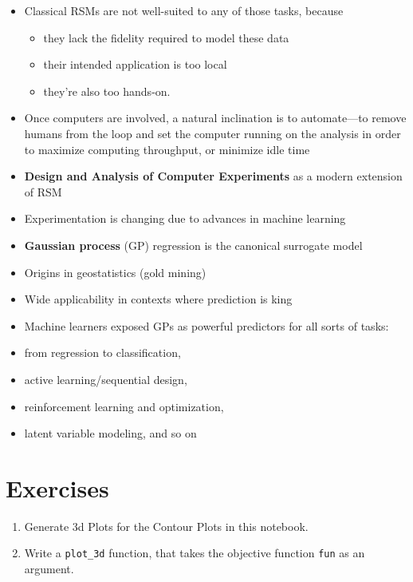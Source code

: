 \documentclass[
  letterpaper,
  DIV=11,
  numbers=noendperiod]{scrreprt}
\providecommand{\tightlist}{%
  \setlength{\itemsep}{0pt}\setlength{\parskip}{0pt}}\usepackage{longtable,booktabs,array}
\begin{document}
\begin{itemize}
\tightlist
\item
  Classical RSMs are not well-suited to any of those tasks, because

  \begin{itemize}
  \tightlist
  \item
    they lack the fidelity required to model these data
  \item
    their intended application is too local
  \item
    they're also too hands-on.
  \end{itemize}
\item
  Once computers are involved, a natural inclination is to automate---to
  remove humans from the loop and set the computer running on the
  analysis in order to maximize computing throughput, or minimize idle
  time
\item
  \textbf{Design and Analysis of Computer Experiments} as a modern
  extension of RSM
\item
  Experimentation is changing due to advances in machine learning
\item
  \textbf{Gaussian process} (GP) regression is the canonical surrogate
  model
\item
  Origins in geostatistics (gold mining)
\item
  Wide applicability in contexts where prediction is king
\item
  Machine learners exposed GPs as powerful predictors for all sorts of
  tasks:
\item
  from regression to classification,
\item
  active learning/sequential design,
\item
  reinforcement learning and optimization,
\item
  latent variable modeling, and so on
\end{itemize}

\section{Exercises}\label{exercises-1}

\begin{enumerate}
\def\labelenumi{\arabic{enumi}.}
\tightlist
\item
  Generate 3d Plots for the Contour Plots in this notebook.
\item
  Write a \texttt{plot\_3d} function, that takes the objective function
  \texttt{fun} as an argument.
\end{enumerate}
\end{document}
